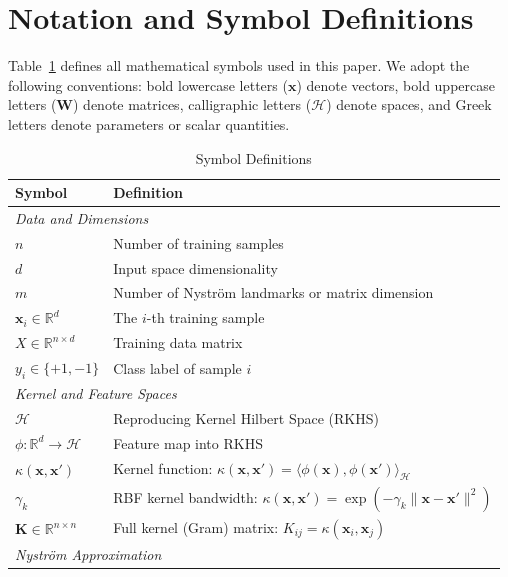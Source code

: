 \documentclass[preprint,review,12pt]{elsarticle}
\begin{document}
\section{Notation and Symbol Definitions}
\label{sec:notation}

Table~\ref{tab:notation} defines all mathematical symbols used in this paper. We adopt the following conventions: bold lowercase letters ($\bm{x}$) denote vectors, bold uppercase letters ($\bm{W}$) denote matrices, calligraphic letters ($\mathcal{H}$) denote spaces, and Greek letters denote parameters or scalar quantities.

\begin{table}[!t]
\centering
\caption{Symbol Definitions}
\label{tab:notation}
\small
\renewcommand{\arraystretch}{1.2}
\begin{tabular}{@{}p{1.4cm}p{6.2cm}@{}}
\toprule
\textbf{Symbol} & \textbf{Definition} \\
\midrule
\multicolumn{2}{l}{\textit{Data and Dimensions}} \\
$n$ & Number of training samples \\
$d$ & Input space dimensionality \\
$m$ & Number of Nystr\"{o}m landmarks or matrix dimension \\
$\bm{x}_i \in \mathbb{R}^d$ & The $i$-th training sample \\
$X \in \mathbb{R}^{n \times d}$ & Training data matrix \\
$y_i \in \{+1, -1\}$ & Class label of sample $i$ \\
\midrule
\multicolumn{2}{l}{\textit{Kernel and Feature Spaces}} \\
$\mathcal{H}$ & Reproducing Kernel Hilbert Space (RKHS) \\
$\phi: \mathbb{R}^d \to \mathcal{H}$ & Feature map into RKHS \\
$\kappa(\bm{x}, \bm{x}')$ & Kernel function: $\kappa(\bm{x}, \bm{x}') = \langle \phi(\bm{x}), \phi(\bm{x}') \rangle_\mathcal{H}$ \\
$\gamma_k$ & RBF kernel bandwidth: $\kappa(\bm{x}, \bm{x}') = \exp(-\gamma_k \|\bm{x} - \bm{x}'\|^2)$ \\
$\bm{K} \in \mathbb{R}^{n \times n}$ & Full kernel (Gram) matrix: $K_{ij} = \kappa(\bm{x}_i, \bm{x}_j)$ \\
\midrule
\multicolumn{2}{l}{\textit{Nystr\"{o}m Approximation}} \\

\end{tabular}
\end{table}
\end{document}
